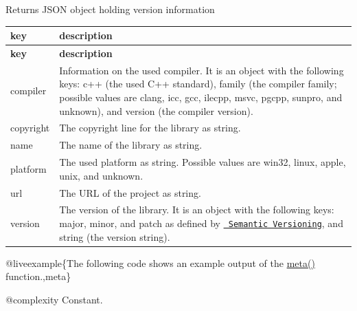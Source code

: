 \begin{DoxyReturn}{Returns}
J\+S\+ON object holding version information \tabulinesep=1mm
\begin{longtabu}spread 0pt [c]{*{2}{|X[-1]}|}
\hline
\PBS\centering \cellcolor{\tableheadbgcolor}\textbf{ key  }&\PBS\centering \cellcolor{\tableheadbgcolor}\textbf{ description   }\\
\endfirsthead
\hline
\endfoot
\hline
\PBS\centering \cellcolor{\tableheadbgcolor}\textbf{ key  }&\PBS\centering \cellcolor{\tableheadbgcolor}\textbf{ description   }\\
\endhead
{\ttfamily compiler}  &Information on the used compiler. It is an object with the following keys\+: {\ttfamily c++} (the used C++ standard), {\ttfamily family} (the compiler family; possible values are {\ttfamily clang}, {\ttfamily icc}, {\ttfamily gcc}, {\ttfamily ilecpp}, {\ttfamily msvc}, {\ttfamily pgcpp}, {\ttfamily sunpro}, and {\ttfamily unknown}), and {\ttfamily version} (the compiler version).   \\
{\ttfamily copyright}  &The copyright line for the library as string.   \\
{\ttfamily name}  &The name of the library as string.   \\
{\ttfamily platform}  &The used platform as string. Possible values are {\ttfamily win32}, {\ttfamily linux}, {\ttfamily apple}, {\ttfamily unix}, and {\ttfamily unknown}.   \\
{\ttfamily url}  &The U\+RL of the project as string.   \\
{\ttfamily version}  &The version of the library. It is an object with the following keys\+: {\ttfamily major}, {\ttfamily minor}, and {\ttfamily patch} as defined by \href{http://semver.org}{\texttt{ Semantic Versioning}}, and {\ttfamily string} (the version string).   \\
\end{longtabu}

\end{DoxyReturn}
@liveexample\{The following code shows an example output of the {\ttfamily \mbox{\hyperlink{classnlohmann_1_1basic__json_aef6d0eeccee7c5c7e1317c2ea1607fab}{meta()}}} function.,meta\}

@complexity Constant.

